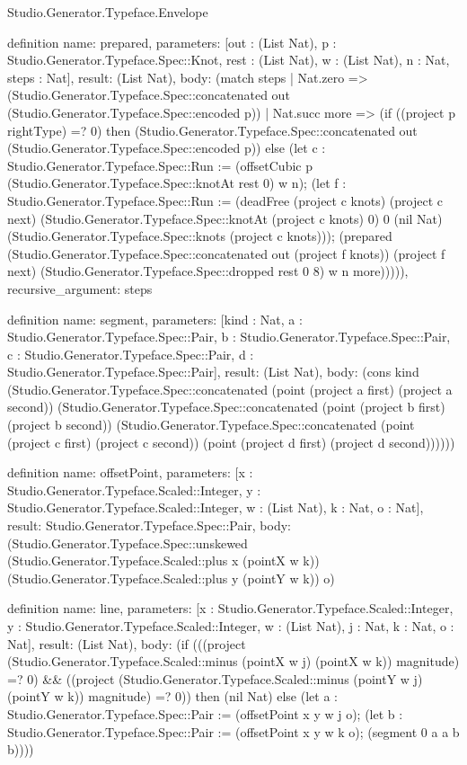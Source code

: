 \begin{lexlean}{Studio.Generator.Typeface.Envelope}
\begin{semanticmodule}
definition{
  name: prepared,
  parameters: [out : (List Nat), p : Studio.Generator.Typeface.Spec::Knot, rest : (List Nat), w : (List Nat), n : Nat, steps : Nat],
  result: (List Nat),
  body: (match steps
    | Nat.zero => (Studio.Generator.Typeface.Spec::concatenated out (Studio.Generator.Typeface.Spec::encoded p))
    | Nat.succ more => (if ((project p rightType) =? 0) then (Studio.Generator.Typeface.Spec::concatenated out (Studio.Generator.Typeface.Spec::encoded p)) else (let c : Studio.Generator.Typeface.Spec::Run := (offsetCubic p (Studio.Generator.Typeface.Spec::knotAt rest 0) w n); (let f : Studio.Generator.Typeface.Spec::Run := (deadFree (project c knots) (project c next) (Studio.Generator.Typeface.Spec::knotAt (project c knots) 0) 0 (nil Nat) (Studio.Generator.Typeface.Spec::knots (project c knots))); (prepared (Studio.Generator.Typeface.Spec::concatenated out (project f knots)) (project f next) (Studio.Generator.Typeface.Spec::dropped rest 0 8) w n more))))),
  recursive_argument: steps
}

definition{
  name: segment,
  parameters: [kind : Nat, a : Studio.Generator.Typeface.Spec::Pair, b : Studio.Generator.Typeface.Spec::Pair, c : Studio.Generator.Typeface.Spec::Pair, d : Studio.Generator.Typeface.Spec::Pair],
  result: (List Nat),
  body: (cons kind (Studio.Generator.Typeface.Spec::concatenated (point (project a first) (project a second)) (Studio.Generator.Typeface.Spec::concatenated (point (project b first) (project b second)) (Studio.Generator.Typeface.Spec::concatenated (point (project c first) (project c second)) (point (project d first) (project d second))))))
}

definition{
  name: offsetPoint,
  parameters: [x : Studio.Generator.Typeface.Scaled::Integer, y : Studio.Generator.Typeface.Scaled::Integer, w : (List Nat), k : Nat, o : Nat],
  result: Studio.Generator.Typeface.Spec::Pair,
  body: (Studio.Generator.Typeface.Spec::unskewed (Studio.Generator.Typeface.Scaled::plus x (pointX w k)) (Studio.Generator.Typeface.Scaled::plus y (pointY w k)) o)
}

definition{
  name: line,
  parameters: [x : Studio.Generator.Typeface.Scaled::Integer, y : Studio.Generator.Typeface.Scaled::Integer, w : (List Nat), j : Nat, k : Nat, o : Nat],
  result: (List Nat),
  body: (if (((project (Studio.Generator.Typeface.Scaled::minus (pointX w j) (pointX w k)) magnitude) =? 0) && ((project (Studio.Generator.Typeface.Scaled::minus (pointY w j) (pointY w k)) magnitude) =? 0)) then (nil Nat) else (let a : Studio.Generator.Typeface.Spec::Pair := (offsetPoint x y w j o); (let b : Studio.Generator.Typeface.Spec::Pair := (offsetPoint x y w k o); (segment 0 a a b b))))
}


\end{semanticmodule}
\end{lexlean}
